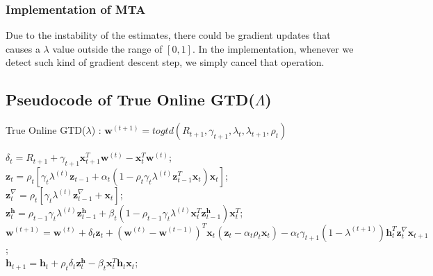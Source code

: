 \documentclass{article}
\begin{document}
\subsubsection{Implementation of MTA}
Due to the instability of the estimates, there could be gradient updates that causes a $\lambda$ value outside the range of $[0, 1]$. In the implementation, whenever we detect such kind of gradient descent step, we simply cancel that operation.

\subsection{Pseudocode of True Online GTD($\Lambda$)}
\begin{algorithm}
\label{alg:true_online_GTD_Lambda}
\caption{True Online GTD($\lambda$) \cite{hasselt2014true}: $\bm{w}^{(t+1)} = togtd(R_{t+1}, \gamma_{t+1},\lambda_{t},\lambda_{t+1},\rho_t)$}
$\delta_t = R_{t+1} + \gamma_{t+1} \bm{x}_{t+1}^T \bm{w}^{(t)} - \bm{x}_{t}^T \bm{w}^{(t)}$;\\
$\bm{z}_t = \rho_t \left[\gamma_t \lambda^{(t)} \bm{z}_{t-1} + \alpha_t (1 - \rho_t \gamma_t \lambda^{(t)} \bm{z}_{t-1}^T\bm{x}_{t}) \bm{x}_{t} \right]$;\\
$\bm{z}_t^\nabla = \rho_t \left[ \gamma_t \lambda^{(t)} \bm{z}_{t-1}^\nabla + \bm{x}_{t} \right]$;\\
$\bm{z}_t^{\bm{h}} = \rho_{t-1} \gamma_t \lambda^{(t)} \bm{z}_{t-1}^{\bm{h}} + \beta_t (1 - \rho_{t-1} \gamma_t \lambda^{(t)} \bm{x}_{t}^T \bm{z}_{t-1}^{\bm{h}})\bm{x}_{t}^T$;\\
$\bm{w}^{(t+1)} = \bm{w}^{(t)} + \delta_t \bm{z}_t + (\bm{w}^{(t)} - \bm{w}^{(t-1)})^T \bm{x}_t(\bm{z}_t - \alpha_t \rho_t \bm{x}_t) - \alpha_t \gamma_{t+1}(1-\lambda^{(t+1)})\bm{h}_t^T \bm{z}_t^\nabla \bm{x}_{t+1}$;\\
$\bm{h}_{t+1} = \bm{h}_{t} + \rho_t \delta_t \bm{z}_t^{\bm{h}} - \beta_t \bm{x}_t^T\bm{h}_{t}\bm{x}_t$;\\
\end{algorithm}
\end{document}
